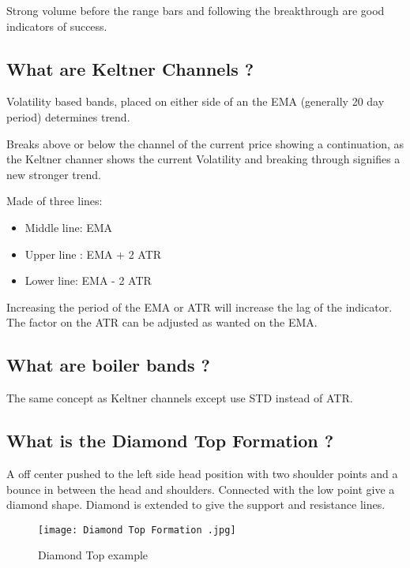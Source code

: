 \documentclass[11pt]{scrartcl} %
\begin{document}
Strong volume before the range bars and following the breakthrough are good indicators of success.

\subsection{What are Keltner Channels ?}

Volatility based bands, placed on either side of an the EMA (generally 20 day period) determines trend.

Breaks above or below the channel of the current price showing a continuation, as the Keltner channer
shows the current Volatility and breaking through signifies a new stronger trend.

Made of three lines:
\begin{itemize}
	\item Middle line: EMA
	\item Upper line : EMA + 2 ATR
	\item Lower line:  EMA - 2 ATR
\end{itemize}

Increasing the period of the EMA or ATR will increase the lag of the indicator.\\

The factor on the ATR can be adjusted as wanted on the EMA.

\subsection{What are boiler bands ?}

The same concept as Keltner channels except use STD instead of ATR.


\subsection{What is the Diamond Top Formation ?}

A off center pushed to the left side head position with two shoulder points and a bounce in between
the head and shoulders. Connected with the low point give a diamond shape. Diamond is extended to give
the support and resistance lines.

\begin{figure}[h] %
	\centering
	\texttt{[image: Diamond Top Formation .jpg]} %
	\caption{Diamond Top example}
\end{figure}
\end{document}
